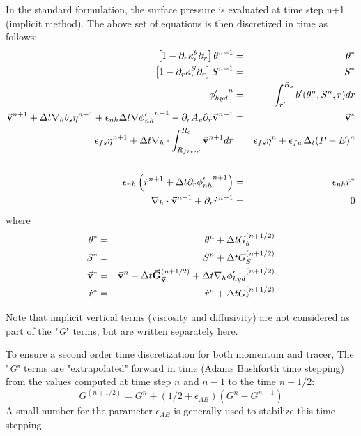 In the standard formulation, the surface pressure is 
evaluated at time step n+1 (implicit method).
The above set of equations is then discretized in time 
as follows:
\begin{eqnarray}
\left[ 1 - \partial_r \kappa_v^\theta \partial_r \right]
\theta^{n+1} & = & \theta^*
\label{eq-tDsC-theta}
\\
\left[ 1 - \partial_r \kappa_v^S \partial_r \right]
S^{n+1} & = & S^*
\label{eq-tDsC-salt}
\\
{\phi'_{hyd}}^{n} & = & \int_{r'}^{R_o} b'(\theta^{n},S^{n},r) dr
\label{eq-tDsC-hyd}
\\
\vec{\bf v} ^{n+1}
+ \Delta t {\bf \nabla}_h b_s {\eta}^{n+1}
+ \epsilon_{nh} \Delta t {\bf \nabla} {\phi'_{nh}}^{n+1}
- \partial_r A_v \partial_r \vec{\bf v}^{n+1}
& = &
\vec{\bf v}^*
\label{eq-tDsC-Hmom}
\\
\epsilon_{fs} {\eta}^{n+1} + \Delta t
{\bf \nabla}_h \cdot \int_{R_{fixed}}^{R_o} \vec{\bf v}^{n+1} dr
& = & 
    \epsilon_{fs} {\eta}^{n} + \epsilon_{fw} \Delta_t (P-E)^{n} 
\nonumber
\\
\label{eq-tDsC-eta}
\\
\epsilon_{nh} \left( \dot{r} ^{n+1}
+ \Delta t \partial_r {\phi'_{nh}} ^{n+1}
\right)
& = & \epsilon_{nh} \dot{r}^*
\label{eq-tDsC-Vmom}
\\
{\bf \nabla}_h \cdot \vec{\bf v}^{n+1} + \partial_r \dot{r}^{n+1}
& = & 0
\label{eq-tDsC-cont}
\end{eqnarray}
where
\begin{eqnarray}
\theta^* & = &
\theta ^{n} + \Delta t G_{\theta} ^{(n+1/2)}
\\
S^* & = &
S ^{n} + \Delta t G_{S} ^{(n+1/2)}
\\
\vec{\bf v}^* & = &
\vec{\bf v}^{n} + \Delta t \vec{\bf G}_{\vec{\bf v}} ^{(n+1/2)}
+ \Delta t  {\bf \nabla}_h {\phi'_{hyd}}^{(n+1/2)}
\\
\dot{r}^* & = &
\dot{r} ^{n} + \Delta t G_{\dot{r}} ^{(n+1/2)}
\end{eqnarray}

Note that implicit vertical terms (viscosity and diffusivity) are 
not considered as part of the "{\it G}" terms, but are 
written separately here.

To ensure a second order time discretization for both 
momentum and tracer,
The "{\it G}" terms are "extrapolated" forward in time
(Adams Bashforth time stepping)
from the values computed at time step $n$ and $n-1$
to the time $n+1/2$:
$$G^{(n+1/2)} = G^n + (1/2+\epsilon_{AB}) (G^n - G^{n-1})$$
A small number for the parameter $\epsilon_{AB}$ is generally used 
to stabilize this time stepping.

